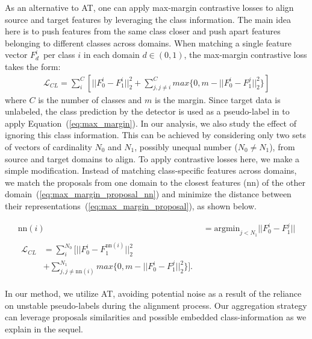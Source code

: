 \documentclass[10pt,twocolumn,letterpaper]{article}
\DeclareRobustCommand{\eqnref}[1]{Equation~(\ref{#1})}
\begin{document}
As an alternative to AT, one can apply max-margin contrastive losses to align source and target features by leveraging the class information.
The main idea here is to push features from the same class closer and push apart features belonging to different classes across domains.
When matching a single feature vector $F_d^i$~per class $i$ in each domain $d \in (0,1)$, the max-margin contrastive loss takes the form: 
\small
\begin{equation} \label{eq:max_margin}
	\begin{split}
    \mathcal{L}_{CL} = \sum_i^C \left[ ||F_0^{i} - F_1^{i}||_2^2 + \sum_{j, j\neq i}^C max\{0, m - ||F_0^{i} - F_1^{j}||_2^2\}\right] 
	\end{split}
\end{equation}
\normalsize
where $C$ is the number of classes and $m$ is the margin.  
Since target data is unlabeled, the class prediction by the detector is used as a pseudo-label in \cite{GPA} to apply \eqnref{eq:max_margin}.
In our analysis, we also study the effect of ignoring this class information. 
This can be achieved by considering only two sets of vectors of cardinality $N_0$ and $N_1$, possibly unequal number ($N_0 \neq N_1$), from source and target domains to align.  
To apply contrastive losses here, we make a simple modification. 
Instead of matching class-specific features across domains, we match the proposals from one domain to the closest features (nn) of the other domain~(\ref{eq:max_margin_proposal_nn}) and minimize the distance between their representations~(\ref{eq:max_margin_proposal}), as shown below.
\begin{small}
	\begin{align} \label{eq:max_margin_proposal_nn}
        \text{nn}(i) &= \text{argmin}_{j<N_1} ||F_0^{i} - F_1^{j}|| \\
        \label{eq:max_margin_proposal}
        \begin{split}
            \mathcal{L}_{CL} &= \sum_i^{N_0} \big[ ||F_0^{i} - F_1^{\text{nn}(i)}||_2^2 
            \\&+ \sum_{j, j\neq \text{nn}(i)}^{N_1} max\{0, m - ||F_0^{i} - F_1^{j}||_2^2\} \big].
        \end{split}
	\end{align}
\end{small}
In our method, we utilize AT, avoiding  potential noise as a result of the reliance on unstable pseudo-labels during the alignment process. Our  aggregation strategy can leverage proposals similarities and possible embedded class-information as we explain in the sequel. 
\end{document}
